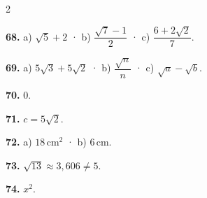 \documentclass[13pt,a4paper]{extarticle}
\begin{document}
\begin{multicols}{2}
\par\noindent\begin{minipage}{\linewidth}
\textbf{68.} a) $\sqrt5+2$ · b) $\dfrac{\sqrt7-1}{2}$ · c) $\dfrac{6+2\sqrt2}{7}$.\par
\end{minipage}\par\vspace{1.6mm}
\par\noindent\begin{minipage}{\linewidth}
\textbf{69.} a) $5\sqrt3+5\sqrt2$ · b) $\dfrac{\sqrt n}{n}$ · c) $\sqrt a-\sqrt b$.\par
\end{minipage}\par\vspace{1.6mm}
\par\noindent\begin{minipage}{\linewidth}
\textbf{70.} $0$.\par
\end{minipage}\par\vspace{1.6mm}
\par\noindent\begin{minipage}{\linewidth}
\textbf{71.} $c=5\sqrt2$.\par
\end{minipage}\par\vspace{1.6mm}
\par\noindent\begin{minipage}{\linewidth}
\textbf{72.} a) $18\,\text{cm}^2$ · b) $6\,\text{cm}$.\par
\end{minipage}\par\vspace{1.6mm}
\par\noindent\begin{minipage}{\linewidth}
\textbf{73.} $\sqrt{13}\approx3{,}606\neq5$.\par
\end{minipage}\par\vspace{1.6mm}
\par\noindent\begin{minipage}{\linewidth}
\textbf{74.} $x^2$.\par


\end{minipage}
\end{multicols}
\end{document}
